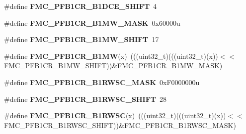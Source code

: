 \begin{DoxyCompactItemize}
\item 
\#define {\bfseries F\+M\+C\+\_\+\+P\+F\+B1\+C\+R\+\_\+\+B1\+D\+C\+E\+\_\+\+S\+H\+I\+FT}~4\hypertarget{group__FMC__Register__Masks_ga47fc3edc8a93d72c87293c77167eb953}{}\label{group__FMC__Register__Masks_ga47fc3edc8a93d72c87293c77167eb953}

\item 
\#define {\bfseries F\+M\+C\+\_\+\+P\+F\+B1\+C\+R\+\_\+\+B1\+M\+W\+\_\+\+M\+A\+SK}~0x60000u\hypertarget{group__FMC__Register__Masks_ga06524893e4c90b6159ef3dbd4ad4c876}{}\label{group__FMC__Register__Masks_ga06524893e4c90b6159ef3dbd4ad4c876}

\item 
\#define {\bfseries F\+M\+C\+\_\+\+P\+F\+B1\+C\+R\+\_\+\+B1\+M\+W\+\_\+\+S\+H\+I\+FT}~17\hypertarget{group__FMC__Register__Masks_ga2a6575dba057107bf40bb006ff912294}{}\label{group__FMC__Register__Masks_ga2a6575dba057107bf40bb006ff912294}

\item 
\#define {\bfseries F\+M\+C\+\_\+\+P\+F\+B1\+C\+R\+\_\+\+B1\+MW}(x)~(((uint32\+\_\+t)(((uint32\+\_\+t)(x))$<$$<$F\+M\+C\+\_\+\+P\+F\+B1\+C\+R\+\_\+\+B1\+M\+W\+\_\+\+S\+H\+I\+FT))\&F\+M\+C\+\_\+\+P\+F\+B1\+C\+R\+\_\+\+B1\+M\+W\+\_\+\+M\+A\+SK)\hypertarget{group__FMC__Register__Masks_ga57e60313cf505baa2cbfb48138a4d746}{}\label{group__FMC__Register__Masks_ga57e60313cf505baa2cbfb48138a4d746}

\item 
\#define {\bfseries F\+M\+C\+\_\+\+P\+F\+B1\+C\+R\+\_\+\+B1\+R\+W\+S\+C\+\_\+\+M\+A\+SK}~0x\+F0000000u\hypertarget{group__FMC__Register__Masks_ga3ab917a9071f70118eaabd80f2ec08e4}{}\label{group__FMC__Register__Masks_ga3ab917a9071f70118eaabd80f2ec08e4}

\item 
\#define {\bfseries F\+M\+C\+\_\+\+P\+F\+B1\+C\+R\+\_\+\+B1\+R\+W\+S\+C\+\_\+\+S\+H\+I\+FT}~28\hypertarget{group__FMC__Register__Masks_ga72daab1c5e2db3b1e521590edc2a153a}{}\label{group__FMC__Register__Masks_ga72daab1c5e2db3b1e521590edc2a153a}

\item 
\#define {\bfseries F\+M\+C\+\_\+\+P\+F\+B1\+C\+R\+\_\+\+B1\+R\+W\+SC}(x)~(((uint32\+\_\+t)(((uint32\+\_\+t)(x))$<$$<$F\+M\+C\+\_\+\+P\+F\+B1\+C\+R\+\_\+\+B1\+R\+W\+S\+C\+\_\+\+S\+H\+I\+FT))\&F\+M\+C\+\_\+\+P\+F\+B1\+C\+R\+\_\+\+B1\+R\+W\+S\+C\+\_\+\+M\+A\+SK)\hypertarget{group__FMC__Register__Masks_ga6559adf24ec0a32fe28703fafd6a235e}{}\label{group__FMC__Register__Masks_ga6559adf24ec0a32fe28703fafd6a235e}


\end{DoxyCompactItemize}
